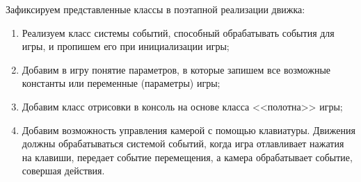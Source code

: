 	Зафиксируем представленные классы в поэтапной реализации движка:
	\begin{enumerate}
		\item Реализуем класс системы событий, способный обрабатывать события для игры, и пропишем его при инициализации игры;
		\item Добавим в игру понятие параметров, в которые запишем все возможные константы или переменные (параметры) игры;
		\item Добавим класс отрисовки в консоль на основе класса <<полотна>> игры;
		\item Добавим возможность управления камерой с помощью клавиатуры. Движения должны обрабатываться системой событий, когда игра отлавливает нажатия на клавиши, передает событие перемещения, а камера обрабатывает событие, совершая действия.
	\end{enumerate}
